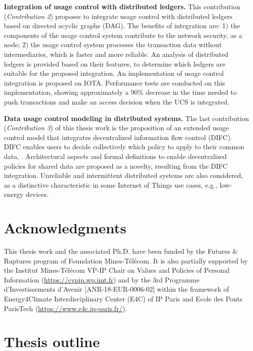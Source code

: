 \textbf{Integration of usage control with distributed ledgers.} This contribution  (\emph{Contribution 2}) proposes to integrate usage control with distributed ledgers based on directed
acyclic graphs (DAG). The benefits of integration are: 1) the components of the usage control system contribute
to the network security, as a node; 2) the usage control
system processes the transaction data without intermediaries,
which is faster and more reliable. An analysis of
distributed ledgers is provided based on their features, to determine which
ledgers are suitable for the proposed integration. An implementation of usage control integration is proposed on IOTA. Performance tests are conducted on this implementation, showing approximately a 90\% decrease
in the time needed to push transactions and make an access decision when the UCS is integrated.

\textbf{Data usage control modeling in distributed systems.} The last contribution (\emph{Contribution 3}) of this thesis work is the proposition of an extended usage control model  that integrates decentralized information flow control (DIFC). DIFC enables users to decide collectively which policy to apply to their common data, .
Architectural aspects and formal definitions to enable decentralized policies for shared data are proposed as a novelty, resulting from the DIFC integration.
Unreliable and intermittent distributed systems are also considered, as a distinctive characteristic in some Internet of Things use cases, e.g., low-energy devices. 

\section{Acknowledgments}

This thesis work and the associated Ph.D. have been funded by the
Futures \& Ruptures program of Foundation Mines-Télécom. It is also partially supported by the Institut Mines-Télécom VP-IP Chair on Values and Policies of Personal Information (\url{https://cvpip.wp.imt.fr}) and by the 3rd Programme d’Investissements d’Avenir [ANR-18-EUR-0006-02]
within the framework of Energy4Climate Interdisciplinary Center (E4C) of IP Paris and Ecole des Ponts ParisTech (\url{https://www.e4c.ip-paris.fr/}). 

\section{Thesis outline}

